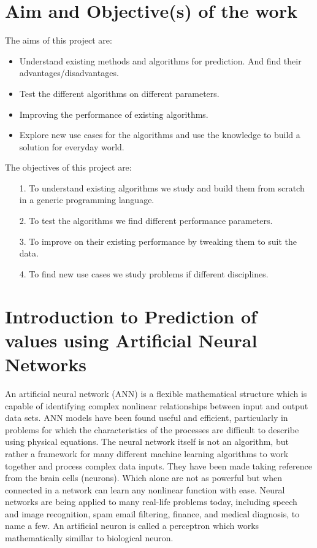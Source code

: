 \documentclass[12pt,times,a4paper]{report}
\begin{document}
{{\begin{normalsize}
\section{Aim and Objective(s) of the work}
The aims of this project are:
\begin{itemize}
    \item Understand existing methods and algorithms for prediction. And find their advantages/disadvantages.
    \item Test the different  algorithms on different parameters. 
    \item Improving the performance of existing algorithms.
    \item Explore new use cases for the algorithms and use the knowledge to build a solution for everyday world.
\end{itemize}
The objectives of this project are:
\begin{itemize}
    \item[1.]To understand existing algorithms we study and build them from scratch in a generic programming language.
    \item[2.]To test the algorithms we find different performance parameters.
    \item[3.]To improve on their existing performance by tweaking them to suit the data.
    \item[4.]To find new use cases we study problems if different disciplines.
\end{itemize}
\newpage
\section{Introduction to Prediction of values using Artificial Neural Networks  }
An artificial neural network (ANN) is a flexible mathematical structure which is capable of identifying complex nonlinear relationships between input and output data sets. ANN models have been found useful and efficient, particularly in problems for which the characteristics of the processes are difficult to describe using physical equations. The neural network itself is not an algorithm, but rather a framework for many different machine learning algorithms to work together and process complex data inputs. They have been made taking reference from the brain cells (neurons). Which alone are not as powerful but when connected in a network can learn any nonlinear function with ease. Neural networks are being applied to many real-life problems today, including speech and image recognition, spam email filtering, finance, and medical diagnosis, to name a few. An artificial neuron is called a perceptron which works mathematically simillar to biological neuron.

\end{normalsize}}}
\end{document}
